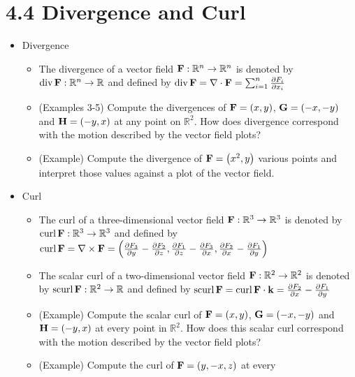 \documentclass[11pt]{article}
\begin{document}
\section*{4.4 Divergence and Curl}
\begin{itemize}
  \item Divergence
    \begin{itemize}
      \item The divergence of a vector field
        \(\mathbf{F}:\mathbb R^n\to\mathbb R^n\) is denoted by
        \(\textrm{div}\,{\mathbf{F}}:\mathbb R^n\to \mathbb R\) and defined by
        \(\textrm{div}\,{\mathbf{F}} = \nabla \cdot \mathbf{F} = \sum_{i=1}^n \frac{\partial F_i}{\partial x_i}\)
      \item (Examples 3-5) Compute the divergences of \(\mathbf{F}=\left(x,y\right)\),
        \(\mathbf{G}=\left(-x,-y\right)\) and \(\mathbf{H}=\left(-y,x\right)\) at
        any point on \(\mathbb R^2\). How does divergence correspond with
        the motion described by the vector field plots?
      \item (Example) Compute the divergence of \(\mathbf{F}=\left(x^2,y\right)\) various
        points and interpret those values against a plot of the vector field.
    \end{itemize}
  \item Curl
    \begin{itemize}
      \item The curl of a three-dimensional vector field
        \(\mathbf{F}:\mathbb R^3\to\mathbb R^3\) is denoted by
        \(\textrm{curl}\,{\mathbf{F}}:\mathbb R^3\to\mathbb R^3\) and defined by
        \(
          \textrm{curl}\,{\mathbf{F}}
            =
          \nabla \times \mathbf{F}
            =
          \left(
            \frac{\partial F_3}{\partial y}-\frac{\partial F_2}{\partial z},
            \frac{\partial F_1}{\partial z}-\frac{\partial F_3}{\partial x},
            \frac{\partial F_2}{\partial x}-\frac{\partial F_1}{\partial y}
          \right)
        \)
      \item The scalar curl of a two-dimensional vector field
        \(\mathbf{F}:\mathbb R^2\to\mathbb R^2\) is denoted by
        \(\textrm{scurl}\,{\mathbf{F}}:\mathbb R^2\to\mathbb R\) and defined by
        \(
          \textrm{scurl}\,{\mathbf{F}}
            =
          \textrm{curl}\,{\mathbf{F}} \cdot \mathbf{k}
            =
          \frac{\partial F_2}{\partial x}-\frac{\partial F_1}{\partial y}
        \)
      \item (Example) Compute the scalar curl of \(\mathbf{F}=\left(x,y\right)\),
        \(\mathbf{G}=\left(-x,-y\right)\) and \(\mathbf{H}=\left(-y,x\right)\) at every point in
        \(\mathbb R^2\).
        How does this scalar curl correspond with
        the motion described by the vector field plots?
      \item (Example) Compute the curl of \(\mathbf{F}=\left(y,-x,z\right)\) at every

\end{itemize}
\end{itemize}
\end{document}
